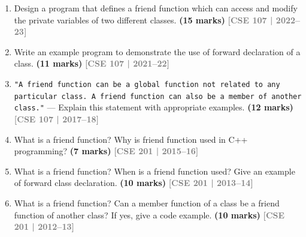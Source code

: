 \documentclass[12pt,a3paper]{article}
\newcommand{\yr}[1]{\hfill\textcolor{gray}{\small\textbf{[#1]}}}
\newcommand{\mk}[1]{\textcolor{orange!70!black}{\small\textbf{(#1 marks)}}}
\begin{document}
\begin{enumerate}
\item Design a program that defines a friend function which can access and modify the private variables of two different classes. \mk{15}
\yr{CSE 107 | 2022--23}




\item Write an example program to demonstrate the use of forward declaration of a class. \mk{11}
\yr{CSE 107 | 2021--22}






\item \texttt{"A friend function can be a global function not related to any particular class. A friend function can also be a member of another class."} --- Explain this statement with appropriate examples. \mk{12}
\yr{CSE 107 | 2017--18}






\item What is a friend function? Why is friend function used in C++ programming? \mk{7}
\yr{CSE 201 | 2015--16}






\item What is a friend function? When is a friend function used? Give an example of forward class declaration. \mk{10}
\yr{CSE 201 | 2013--14}





\item What is a friend function? Can a member function of a class be a friend function of another class? If yes, give a code example. \mk{10}
\yr{CSE 201 | 2012--13}






\end{enumerate}
\end{document}
